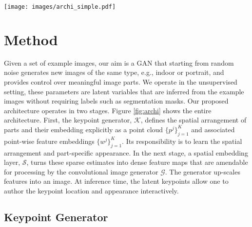 \documentclass[10pt, conference, compsocconf]{IEEEtran}
\newcommand{\vk}{\mathbf{k}}
\newcommand{\vw}{\mathbf{w}}
\newcommand{\vz}{\mathbf{z}}
\newcommand{\cG}{\mathcal G}
\newcommand{\cK}{\mathcal K}
\newcommand{\cS}{\mathcal S}
\begin{document}
\begin{figure*}
\begin{center}
\texttt{[image: images/archi\_simple.pdf]}
\end{center}
   \caption{\textbf{Overview.} Starting from noise $\vz$, LatentKeypointGAN generates keypoint coordinates, $\vk$ and their embeddings $\vw$. Cruicial is how they are turned into feature maps that are localized around the keypoints, forming conditional maps for the image generation via SPADE block at different resolutions. At inference time, the position and embedding of keypoints can be edited by the user to control the position and appearance of parts.
}
\label{fig:archi}
\end{figure*}















\section{Method}

Given a set of example images, our aim is a GAN that starting from random noise generates new images of the same type, e.g., indoor or portrait, and provides control over meaningful image parts.
We operate in the unsupervised setting, these parameters are latent variables that are inferred from the example images without requiring labels such as segmentation masks. 
Our proposed architecture operates in two stages. Figure \ref{fig:archi} shows the entire architecture.
First, the keypoint generator, $\cK$, defines the spatial arrangement of parts and their embedding explicitly as a point cloud $\{p^j\}_{j=1}^K$ and associated point-wise feature embeddings $\{w^j\}_{j=1}^K$. Its responsibility is to learn the spatial arrangement and part-specific appearance.
In the next stage, a spatial embedding layer, $\cS$, turns these sparse estimates into dense feature maps that are amendable for processing by the convolutional image generator $\cG$. The generator up-scales features into an image. 
At inference time, the latent keypoints allow one to author the keypoint location and appearance interactively.

\subsection{Keypoint Generator}
\label{sec: keypoint generator}
\end{document}
